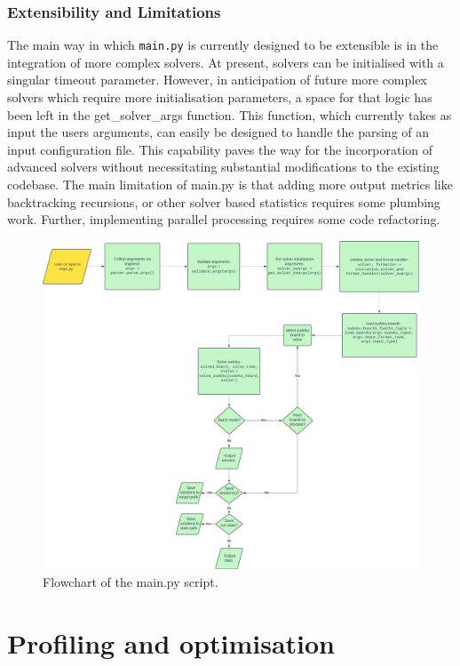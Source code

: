 \documentclass[11pt]{article}
\begin{document}
\begin{itemize}
\subsubsection{Extensibility and Limitations}
The main way in which \texttt{main.py} is currently designed to be extensible is in the integration of more complex solvers. At present, solvers can be initialised with a singular timeout parameter. However, in anticipation of future more complex solvers which require more initialisation parameters, a space for that logic has been left in the get\_solver\_args function. This function, which currently takes as input the users arguments, can easily be designed to handle the parsing of an input configuration file. This capability paves the way for the incorporation of advanced solvers without necessitating substantial modifications to the existing codebase. 
The main limitation of main.py is that adding more output metrics like backtracking recursions, or other solver based statistics requires some plumbing work. Further, implementing parallel processing requires some code refactoring. 
\begin{figure}[H]
    \centering
    \includegraphics[width=1\textwidth]{figs/main_flowchart.png}
    \caption{Flowchart of the main.py script.}
    \label{fig:main_flowchart}
\end{figure}


\section{Profiling and optimisation}


\end{itemize}
\end{document}
